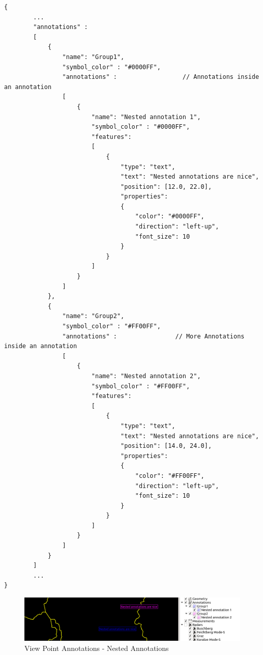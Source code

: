 \begin{lstlisting}[basicstyle=\small\ttfamily]
{
        ...
        "annotations" :
        [
            {
                "name": "Group1",
                "symbol_color" : "#0000FF",
                "annotations" :                  // Annotations inside an annotation
                [
                    {
                        "name": "Nested annotation 1",
                        "symbol_color" : "#0000FF",
                        "features":
                        [
                            {
                                "type": "text",
                                "text": "Nested annotations are nice",
                                "position": [12.0, 22.0],
                                "properties":
                                {
                                    "color": "#0000FF",
                                    "direction": "left-up",
                                    "font_size": 10
                                }
                            }
                        ]
                    }
                ]
            },
            {
                "name": "Group2",
                "symbol_color" : "#FF00FF",
                "annotations" :                // More Annotations inside an annotation
                [
                    {
                        "name": "Nested annotation 2",
                        "symbol_color" : "#FF00FF",
                        "features":
                        [
                            {
                                "type": "text",
                                "text": "Nested annotations are nice",
                                "position": [14.0, 24.0],
                                "properties":
                                {
                                    "color": "#FF00FF",
                                    "direction": "left-up",
                                    "font_size": 10
                                }
                            }
                        ]
                    }
                ]
            }                
        ]
        ... 
}
\end{lstlisting}

\begin{figure}[H]
    \center
        \includegraphics[width=14cm]{figures/viewpoints_anno_example_nested.png}
    \caption{View Point Annotations - Nested Annotations} 
\end{figure}
